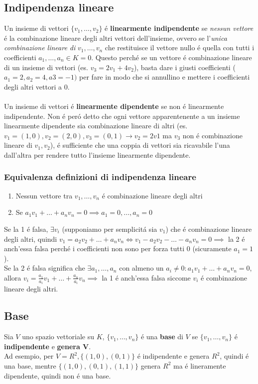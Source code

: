 \documentclass{article}
\begin{document}
\subsection{Indipendenza lineare}
Un insieme di vettori $\{v_1, \dots, v_2\}$ é \textbf{linearmente indipendente} se \textit{nessun vettore} é la combinazione lineare degli altri vettori dell'insieme, ovvero se l'\textit{unica combinazione lineare di} $v_1, \dots, v_n$ che restituisce il vettore nullo é quella con tutti i coefficienti $a_1, \dots, a_n \in K = 0$. Questo perché se un vettore é combinazione lineare di un insieme di vettori (es. $v_3 = 2v_1 + 4v_2$), basta dare i giusti coefficienti ($a_1=2, a_2=4, a3=-1)$ per fare in modo che si annullino e mettere i coefficienti degli altri vettori a 0.\\\\
Un insieme di vettori é \textbf{linearmente dipendente} se non é linearmente indipendente. Non é peró detto che ogni vettore apparentenente a un insieme linearmente dipendente sia combinazione lineare di altri (es. $v_1 = (1,0), v_2 = (2,0), v_3 = (0,1) \rightarrow v_2=2v1$ ma $v_3$ non é combinazione lineare di $v_1, v_2$), é sufficiente che una coppia di vettori sia ricavabile l'una dall'altra per rendere tutto l'insieme linearmente dipendente.

\subsubsection{Equivalenza definizioni di indipendenza lineare}
\begin{enumerate}
	\item Nessun vettore tra $v_1, \dots, v_n$ é combinazione lineare degli altri
	\item Se $a_1v_1 + \dots + a_nv_n = 0 \implies a_1=0, \dots,a_n=0$
\end{enumerate}
Se la 1 é falsa, $\exists v_i$ (supponiamo per semplicitá sia $v_1$) che é combinazione lineare degli altri, quindi $v_1 = a_2v_2 + \dots + a_nv_n \iff v_1 - a_2v_2 - \dots - a_nv_n = 0 \implies$ la 2 é anch'essa falsa perché i coefficienti non sono per forza tutti 0 (sicuramente $a_1=1$).\\
Se la 2 é falsa significa che $\exists a_1, \dots, a_n$ con almeno un $a_i \ne 0 : a_1v_1 + \dots + a_nv_n = 0$, allora $\displaystyle v_i = \frac{a_1}{a_i}v_1 + \dots + \frac{a_n}{a_i}v_n \implies$ la 1 é anch'essa falsa siccome $v_i$ é combinazione lineare degli altri.

\subsection{Base}
Sia $V$ uno spazio vettoriale su $K$, $\{v_1, \dots, v_n\}$ é una \textbf{base} di $V$ se $\{v_1, \dots, v_n\}$ é \textbf{indipendente} e \textbf{genera V}.\\
Ad esempio, per $V=R^2, \{(1,0),(0,1)\}$ é indipendente e genera $R^2$, quindi é una base, mentre $\{(1,0), (0,1), (1,1)\}$ genera $R^2$ ma é lineramente dipendente, quindi non é una base.
\end{document}
